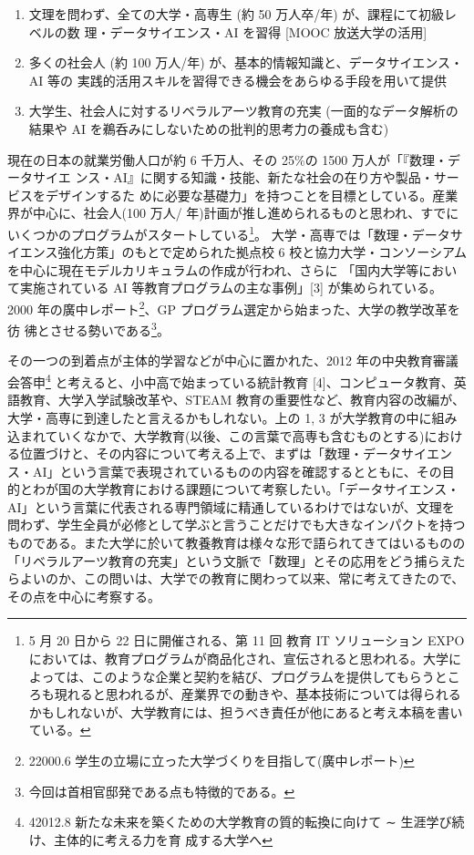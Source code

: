 \documentclass[
]{book}
\theoremstyle{definition}
\theoremstyle{definition}
\theoremstyle{definition}
\theoremstyle{definition}
\theoremstyle{remark}
\begin{document}
\begin{enumerate}
\def\labelenumi{\arabic{enumi}.}
\item
  文理を問わず、全ての大学・高専生 (約 50 万人卒/年) が、課程にて初級レベルの数 理・データサイエンス・AI を習得 {[}MOOC 放送大学の活用{]}
\item
  多くの社会人 (約 100 万人/年) が、基本的情報知識と、データサイエンス・AI 等の 実践的活用スキルを習得できる機会をあらゆる手段を用いて提供
\item
  大学生、社会人に対するリベラルアーツ教育の充実 (一面的なデータ解析の結果や AI を鵜呑みにしないための批判的思考力の養成も含む)
\end{enumerate}

現在の日本の就業労働人口が約 6 千万人、その 25\%の 1500 万人が「『数理・データサイエ ンス・AI』に関する知識・技能、新たな社会の在り方や製品・サービスをデザインするた めに必要な基礎力」を持つことを目標としている。産業界が中心に、社会人(100 万人/ 年)計画が推し進められるものと思われ、すでにいくつかのプログラムがスタートしている\footnote{5 月 20 日から 22 日に開催される、第 11 回 教育 IT ソリューション EXPO においては、教育プログラムが商品化され、宣伝されると思われる。大学によっては、このような企業と契約を結び、プログラムを提供してもらうところも現れると思われるが、産業界での動きや、基本技術については得られるかもしれないが、大学教育には、担うべき責任が他にあると考え本稿を書いている。}。
大学・高専では「数理・データサイエンス強化方策」のもとで定められた拠点校 6 校と協力大学・コンソーシアムを中心に現在モデルカリキュラムの作成が行われ、さらに
「国内大学等において実施されている AI 等教育プログラムの主な事例」{[}3{]} が集められている。2000 年の廣中レポート\footnote{22000.6 学生の立場に立った大学づくりを目指して(廣中レポート)}、GP プログラム選定から始まった、大学の教学改革を彷 彿とさせる勢いである\footnote{今回は首相官邸発である点も特徴的である。}。

その一つの到着点が主体的学習などが中心に置かれた、2012 年の中央教育審議会答申\footnote{42012.8 新たな未来を築くための大学教育の質的転換に向けて ∼ 生涯学び続け、主体的に考える力を育
  成する大学へ} と考えると、小中高で始まっている統計教育 {[}4{]}、コンピュータ教育、英語教育、大学入学試験改革や、STEAM 教育の重要性など、教育内容の改編が、大学・高専に到達したと言えるかもしれない。上の 1, 3 が大学教育の中に組み込まれていくなかで、大学教育(以後、この言葉で高専も含むものとする)における位置づけと、その内容について考える上で、まずは「数理・データサイエンス・AI」という言葉で表現されているものの内容を確認するとともに、その目的とわが国の大学教育における課題について考察したい。「データサイエンス・AI」という言葉に代表される専門領域に精通しているわけではないが、文理を問わず、学生全員が必修として学ぶと言うことだけでも大きなインパクトを持つものである。また大学に於いて教養教育は様々な形で語られてきてはいるものの「リベラルアーツ教育の充実」という文脈で「数理」とその応用をどう捕らえたらよいのか、この問いは、大学での教育に関わって以来、常に考えてきたので、その点を中心に考察する。
\end{document}
